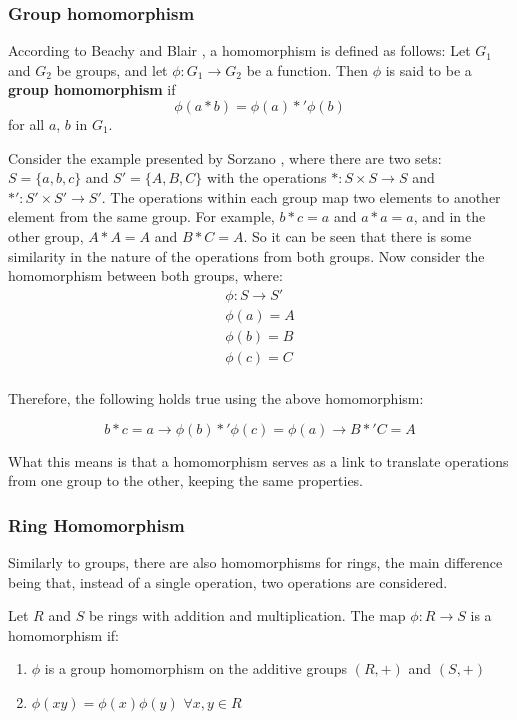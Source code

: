 \subsubsection{Group homomorphism}

According to Beachy and Blair \cite{beachy2006abstract}, a homomorphism is defined as follows: Let $G_{1}$ and $G_{2}$ be groups, and let $\phi: G_{1} \rightarrow G_{2}$ be a function. Then $\phi$ is said to be a \textbf{group homomorphism} if
\[
\phi(a*b) = \phi(a) *' \phi(b)
\]
for all $a$, $b$ in $G_{1}$.

Consider the example presented by Sorzano \cite{sorzano2013}, where there are two sets: $S= \{a, b, c\}$ and $S' = \{A, B, C\}$  with the operations $*: S \times S \rightarrow S$ and $*' : S' \times S' \rightarrow S'$. The operations within each group map two elements to another element from the same group. For example, $b*c=a$ and $a*a=a$, and in the other group, $A*A = A$ and $B*C=A$. So it can be seen that there is some similarity in the nature of the operations from both groups. Now consider the homomorphism between both groups, where:
\[
\begin{split}
  \phi: S \rightarrow S' \\
  \phi(a) = A \\
  \phi(b) = B \\
  \phi(c) = C \\
\end{split}
\]

\noindent Therefore, the following holds true using the above homomorphism:

\[
b*c=a \rightarrow \phi(b) *' \phi(c) = \phi(a) \rightarrow B *' C = A
\]

What this means is that a homomorphism serves as a link to translate operations from one group to the other, keeping the same properties.

\subsubsection{Ring Homomorphism}

Similarly to groups, there are also homomorphisms for rings, the main difference being that, instead of a single operation, two operations are considered.

Let $R$ and $S$ be rings with addition and multiplication. The map $\phi: R \rightarrow S$ is a homomorphism if:
\begin{enumerate}
\item $\phi$ is a group homomorphism on the additive groups $(R, +)$ and $(S,+)$
\item $\phi(xy) = \phi(x) \phi(y)$ $\forall x, y \in R$
\end{enumerate}

